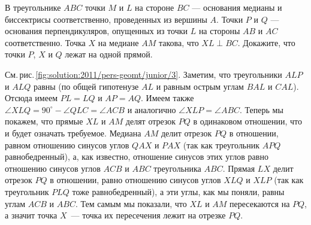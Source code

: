 В треугольнике $ABC$ точки $M$ и $L$ на стороне $BC$ --- основания медианы и
биссектрисы соответственно, проведенных из вершины $A$.
Точки $P$ и $Q$ --- основания перпендикуляров, опущенных из точки $L$ на
стороны $AB$ и $AC$ соответственно.
Точка $X$ на медиане $AM$ такова, что $XL \perp BC$.
Докажите, что точки $P$, $X$ и $Q$ лежат на одной прямой. 

%
\label{solution:2011/pers-geomt/junior/3}%
См.\,рис.\,\ref{fig:solution:2011/pers-geomt/junior/3}.
Заметим, что треугольники $ALP$ и $ALQ$ равны
(по общей гипотенузе $AL$ и равным острым углам $BAL$ и $CAL$).
Отсюда имеем $PL = LQ$ и $AP = AQ$.
Имеем также
$\angle XLQ = 90^\circ - \angle QLC = \angle ACB$
и аналогично $\angle XLP = \angle ABC$.
Теперь мы покажем, что прямые $XL$ и $AM$ делят отрезок $PQ$ в одинаковом
отношении, что и будет означать требуемое.
Медиана $AM$ делит отрезок $PQ$ в отношении, равном отношению синусов углов
$QAX$ и $PAX$ (так как треугольник $APQ$ равнобедренный), а, как известно,
отношение синусов этих углов равно отношению синусов углов $ACB$ и $ABC$
треугольника $ABC$.
Прямая $LX$ делит отрезок $PQ$ в отношении, равно отношению синусов углов $XLQ$
и $XLP$ (так как треугольник $PLQ$ тоже равнобедренный), а эти углы, как мы
поняли, равны углам $ACB$ и $ABC$.
Тем самым мы показали, что $XL$ и $AM$ пересекаются на $PQ$, а значит точка
$X$~--- точка их пересечения лежит на отрезке $PQ$.


